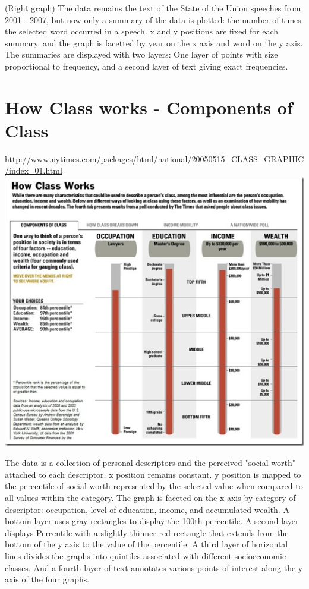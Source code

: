 \documentclass{article}
\begin{document}
(Right graph)  The data remains the text of the State of the Union speeches from 2001 - 2007, but now only a summary of the data is plotted: the number of times the selected word occurred in a speech. x and y positions are fixed for each summary, and the graph is facetted by year on the x axis and word on the y axis. The summaries are displayed with two layers: One layer of points with size proportional to frequency, and a second layer of text giving exact frequencies.

\section{How Class works - Components of Class}
\href{http://www.nytimes.com/packages/html/national/20050515\_CLASS\_GRAPHIC/index\_01.html}{http://www.nytimes.com/packages/html/national/20050515\_CLASS\_GRAPHIC/index\_01.html}\\

  \includegraphics[width=1.0\textwidth]{plots/nytimesHowClassWorks.jpg} %

The data is a collection of personal descriptors and the perceived "social worth" attached to each descriptor. x position remains constant. y position is mapped to the percentile of social worth represented by the selected value when compared to all values within the category. The graph is faceted on the x axis by category of descriptor: occupation, level of education, income, and accumulated wealth. A bottom layer uses gray rectangles to display the 100th percentile. A second layer displays Percentile with a slightly thinner red rectangle that extends from the bottom of the y axis to the value of the percentile. A third layer of horizontal lines divides the graphs into quintiles associated with different socioeconomic classes. And a fourth layer of text annotates various points of interest along the y axis of the four graphs.
\end{document}
